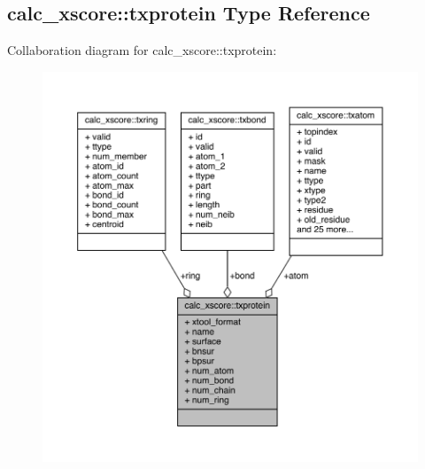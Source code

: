 \hypertarget{structcalc__xscore_1_1txprotein}{\subsection{calc\-\_\-xscore\-:\-:txprotein Type Reference}
\label{structcalc__xscore_1_1txprotein}
}


Collaboration diagram for calc\-\_\-xscore\-:\-:txprotein\-:
\nopagebreak
\begin{figure}[H]
\begin{center}
\leavevmode
\includegraphics[width=350pt]{structcalc__xscore_1_1txprotein__coll__graph}
\end{center}
\end{figure}
